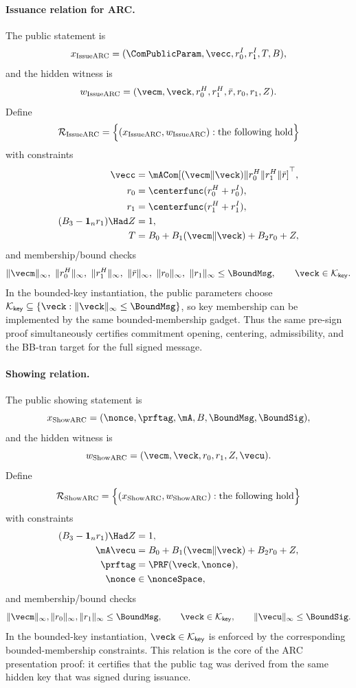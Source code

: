 \paragraph{Issuance relation for ARC.}
The public statement is
\[
  x_{\mathrm{IssueARC}}=(\ComPublicParam,\vecc,r_0^I,r_1^I,T,B),
\]
and the hidden witness is
\[
  w_{\mathrm{IssueARC}}=(\vecm,\veck,r_0^H,r_1^H,\bar r,r_0,r_1,Z).
\]
Define
\[
  \mathcal R_{\mathrm{IssueARC}}
  =
  \Bigl\{(x_{\mathrm{IssueARC}},w_{\mathrm{IssueARC}}): \text{the following hold}\Bigr\}
\]
with constraints
\begin{align}
  \vecc &= \mACom[(\vecm\Vert\veck)\Vert r_0^H\Vert r_1^H\Vert \bar r]^\top, \label{eq:issuearc-rel-commit}\\
  r_0 &= \centerfunc(r_0^H+r_0^I), \label{eq:issuearc-rel-center0}\\
  r_1 &= \centerfunc(r_1^H+r_1^I), \label{eq:issuearc-rel-center1}\\
  (B_3-\mathbf 1_n r_1)\Had Z &= 1, \label{eq:issuearc-rel-inv}\\
  T &= B_0+B_1(\vecm\Vert\veck)+B_2r_0+Z, \label{eq:issuearc-rel-target}
\end{align}
and membership/bound checks
\[
  \|\vecm\|_\infty,\ \|r_0^H\|_\infty,\ \|r_1^H\|_\infty,\ \|\bar r\|_\infty,
  \ \|r_0\|_\infty,\ \|r_1\|_\infty
  \le \BoundMsg,
  \qquad
  \veck\in\mathcal K_{\mathsf{key}}.
\]
In the bounded-key instantiation, the public parameters choose
$\mathcal K_{\mathsf{key}}\subseteq\{\veck:\|\veck\|_\infty\le\BoundMsg\}$, so key membership can be
implemented by the same bounded-membership gadget.
Thus the same pre-sign proof simultaneously certifies commitment opening, centering, admissibility, and the
BB-tran target for the full signed message.

\paragraph{Showing relation.}
The public showing statement is
\[
  x_{\mathrm{ShowARC}}=(\nonce,\prftag,\mA,B,\BoundMsg,\BoundSig),
\]
and the hidden witness is
\[
  w_{\mathrm{ShowARC}}=(\vecm,\veck,r_0,r_1,Z,\vecu).
\]
Define
\[
  \mathcal R_{\mathrm{ShowARC}}
  =
  \Bigl\{(x_{\mathrm{ShowARC}},w_{\mathrm{ShowARC}}): \text{the following hold}\Bigr\}
\]
with constraints
\begin{align}
  (B_3-\mathbf 1_n r_1)\Had Z &= 1, \label{eq:showarc-rel-inv}\\
  \mA\vecu &= B_0+B_1(\vecm\Vert\veck)+B_2r_0+Z, \label{eq:showarc-rel-sig}\\
  \prftag &= \PRF(\veck,\nonce), \label{eq:showarc-rel-prf}\\
  \nonce &\in \nonceSpace, \label{eq:showarc-rel-nonce}
\end{align}
and membership/bound checks
\[
  \|\vecm\|_\infty,\|r_0\|_\infty,\|r_1\|_\infty\le \BoundMsg,
  \qquad
  \veck\in\mathcal K_{\mathsf{key}},
  \qquad
  \|\vecu\|_\infty\le \BoundSig.
\]
In the bounded-key instantiation, $\veck\in\mathcal K_{\mathsf{key}}$ is enforced by the corresponding
bounded-membership constraints.
This relation is the core of the ARC presentation proof: it certifies that the public tag was derived from the
same hidden key that was signed during issuance.


